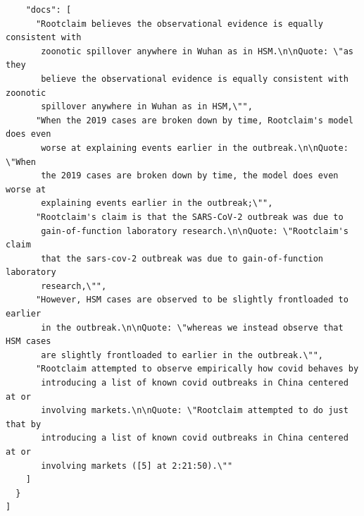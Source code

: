 \documentclass{article}
\begin{document}
\begin{verbatim}
    "docs": [
      "Rootclaim believes the observational evidence is equally consistent with 
       zoonotic spillover anywhere in Wuhan as in HSM.\n\nQuote: \"as they 
       believe the observational evidence is equally consistent with zoonotic 
       spillover anywhere in Wuhan as in HSM,\"",
      "When the 2019 cases are broken down by time, Rootclaim's model does even 
       worse at explaining events earlier in the outbreak.\n\nQuote: \"When 
       the 2019 cases are broken down by time, the model does even worse at 
       explaining events earlier in the outbreak;\"",
      "Rootclaim's claim is that the SARS-CoV-2 outbreak was due to 
       gain-of-function laboratory research.\n\nQuote: \"Rootclaim's claim 
       that the sars-cov-2 outbreak was due to gain-of-function laboratory 
       research,\"",
      "However, HSM cases are observed to be slightly frontloaded to earlier 
       in the outbreak.\n\nQuote: \"whereas we instead observe that HSM cases 
       are slightly frontloaded to earlier in the outbreak.\"",
      "Rootclaim attempted to observe empirically how covid behaves by 
       introducing a list of known covid outbreaks in China centered at or 
       involving markets.\n\nQuote: \"Rootclaim attempted to do just that by 
       introducing a list of known covid outbreaks in China centered at or 
       involving markets ([5] at 2:21:50).\""
    ]
  }
]
\end{verbatim}
\end{document}
